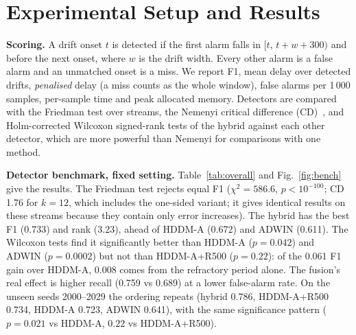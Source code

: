 \documentclass[conference]{IEEEtran}
\begin{document}
\section{Experimental Setup and Results}
\textbf{Scoring.} A drift onset $t$ is detected if the first alarm falls in $[t,\,t+w+300)$ and before the next onset, where $w$ is the drift width. Every other alarm is a false alarm and an unmatched onset is a miss. We report F1, mean delay over detected drifts, \emph{penalised} delay (a miss counts as the whole window), false alarms per 1\,000 samples, per-sample time and peak allocated memory. Detectors are compared with the Friedman test over streams, the Nemenyi critical difference (CD)~\cite{demsar2006}, and Holm-corrected Wilcoxon signed-rank tests of the hybrid against each other detector, which are more powerful than Nemenyi for comparisons with one method.

\textbf{Detector benchmark, fixed setting.} Table~\ref{tab:overall} and Fig.~\ref{fig:bench} give the results. The Friedman test rejects equal F1 ($\chi^2=586.6$, $p<10^{-100}$; CD 1.76 for $k=12$, which includes the one-sided variant; it gives identical results on these streams because they contain only error increases). The hybrid has the best F1 (0.733) and rank (3.23), ahead of HDDM-A (0.672) and ADWIN (0.611). The Wilcoxon tests find it significantly better than HDDM-A ($p=0.042$) and ADWIN ($p=0.0002$) but not than HDDM-A+R500 ($p=0.22$): of the 0.061 F1 gain over HDDM-A, 0.008 comes from the refractory period alone. The fusion's real effect is higher recall (0.759 vs 0.689) at a lower false-alarm rate. On the unseen seeds 2000--2029 the ordering repeats (hybrid 0.786, HDDM-A+R500 0.734, HDDM-A 0.723, ADWIN 0.641), with the same significance pattern ($p=0.021$ vs HDDM-A, $0.22$ vs HDDM-A+R500).
\end{document}
